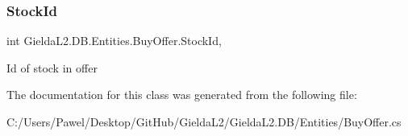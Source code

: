 \subsubsection{\texorpdfstring{StockId}{StockId}}
{\footnotesize\ttfamily int Gielda\+L2.\+D\+B.\+Entities.\+Buy\+Offer.\+Stock\+Id\hspace{0.3cm}{\ttfamily [get]}, {\ttfamily [set]}}



Id of stock in offer 



The documentation for this class was generated from the following file\+:\begin{DoxyCompactItemize}
\item 
C\+:/\+Users/\+Pawel/\+Desktop/\+Git\+Hub/\+Gielda\+L2/\+Gielda\+L2.\+D\+B/\+Entities/Buy\+Offer.\+cs\end{DoxyCompactItemize}
